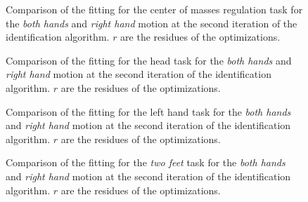 \documentclass[letterpaper, 10pt, conference]{ieeeconf}      %
\begin{document}

\begin{figure}[t]
  \centering
\caption{Comparison of the fitting for the center of masses regulation task for the \emph{both hands} and \emph{right hand} motion at the second iteration of the identification algorithm.
$r$ are the residues of the optimizations.}
\label{fig:exp1:taskCom1}
\end{figure}

\begin{figure}[t]
  \centering
\caption{Comparison of the fitting for the head task for the \emph{both hands} and \emph{right hand} motion at the second iteration of the identification algorithm.
$r$ are the residues of the optimizations.}
\label{fig:exp1:taskHead1}
\end{figure}

\begin{figure}[t]
  \centering
  \caption{Comparison of the fitting for the left hand task for the
    \emph{both hands} and \emph{right hand} motion at the second
    iteration of the identification algorithm.  $r$ are
    the residues of the optimizations.}
  \label{fig:exp1:taskLhand1}
\end{figure}

\begin{figure}[t]
  \centering
\caption{Comparison of the fitting for the \emph{two feet} task for the \emph{both hands} and \emph{right hand} motion at the second iteration of the identification algorithm. $r$ are the residues of the optimizations.}
\label{fig:exp1:taskTwofeet1}
\end{figure}
\end{document}
